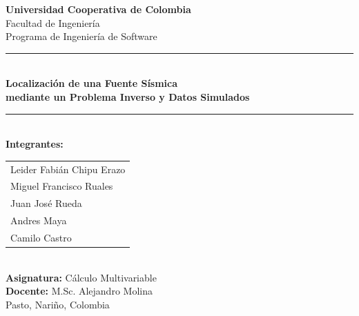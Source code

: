 \documentclass[12pt, a4paper]{article}
\begin{document}

\begin{titlepage}
    \centering
    \vspace*{0.8cm}
    {\Large \textbf{Universidad Cooperativa de Colombia}}\\[0.2cm]
    {\large Facultad de Ingeniería}\\[0.15cm]
    {\large Programa de Ingeniería de Software}\\[2.2cm]

    \rule{\textwidth}{1.5pt}\\[0.5cm]
    {\LARGE \textbf{Localización de una Fuente Sísmica}}\\[0.4cm]
    {\Large \textbf{mediante un Problema Inverso y Datos Simulados}}\\[0.5cm]
    \rule{\textwidth}{1.5pt}\\[2cm]

    {\large \textbf{Integrantes:}}\\[0.4cm]
    \begin{tabular}{l}
        Leider Fabián Chipu Erazo   \\
        Miguel Francisco Ruales     \\
        Juan José Rueda             \\
        Andres Maya                 \\
        Camilo Castro              \\
    \end{tabular}\\[1.8cm]

    {\large \textbf{Asignatura:} Cálculo Multivariable}\\[0.3cm]
    {\large \textbf{Docente:} M.Sc. Alejandro Molina}\\[1.8cm]

    {\large Pasto, Nariño, Colombia}\\[0.2cm]
    
    \vfill
\end{titlepage}
\end{document}
